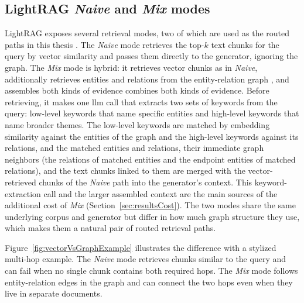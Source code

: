 \documentclass[english, bibtex]{kththesis}               %
\numberwithin{listing}{chapter}
\providecommand{\DIFaddtex}[1]{{\protect\color{blue} \sf #1}} %
\providecommand{\DIFdeltex}[1]{{\protect\color{red} \scriptsize #1}} %
\providecommand{\DIFaddbegin}{} %
\providecommand{\DIFaddend}{} %
\providecommand{\DIFdelbegin}{} %
\providecommand{\DIFdelend}{} %
\providecommand{\DIFadd}[1]{\texorpdfstring{\DIFaddtex{#1}}{#1}} %
\providecommand{\DIFdel}[1]{\texorpdfstring{\DIFdeltex{#1}}{}} %
\begin{document}
\subsection{LightRAG \emph{Naive} and \emph{Mix} modes}
\label{sec:backgroundLightragModes}

LightRAG exposes several retrieval modes, two of which are used as the routed paths in this thesis \cite{lightrag2024}. The \emph{Naive} mode retrieves the top-\(k\) text chunks for the query by vector similarity and passes them directly to the generator, ignoring the graph. The \emph{Mix} mode \DIFdelbegin \DIFdel{is hybrid: it retrieves vector chunks as in \emph{Naive}, additionally retrieves entities and relations from the entity-relation graph , and assembles both kinds of evidence }\DIFdelend \DIFaddbegin \DIFadd{combines both kinds of evidence. Before retrieving, it makes one \gls{llm} call that extracts two sets of keywords from the query: low-level keywords that name specific entities and high-level keywords that name broader themes. The low-level keywords are matched by embedding similarity against the entities of the graph and the high-level keywords against its relations, and the matched entities and relations, their immediate graph neighbors (the relations of matched entities and the endpoint entities of matched relations), and the text chunks linked to them are merged with the vector-retrieved chunks of the \emph{Naive} path }\DIFaddend into the generator's context. \DIFaddbegin \DIFadd{This keyword-extraction call and the larger assembled context are the main sources of the additional cost of \emph{Mix} (Section~\ref{sec:resultsCost}). }\DIFaddend The two modes share the same underlying corpus and generator but differ in how much graph structure they use, which makes them a natural pair of routed retrieval paths.

Figure~\ref{fig:vectorVsGraphExample} illustrates the difference with a stylized multi-hop example. The \emph{Naive} mode retrieves chunks similar to the query and can fail when no single chunk contains both required hops. The \emph{Mix} mode follows entity-relation edges in the graph and can connect the two hops even when they live in separate documents.
\end{document}
